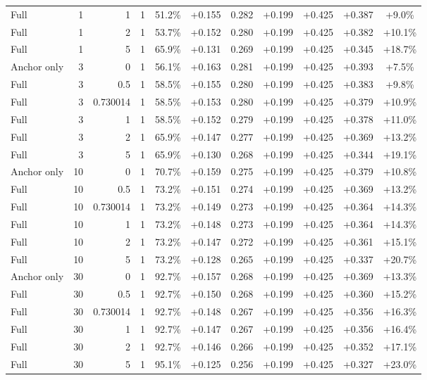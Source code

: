 \begin{table}[htbp]
\begin{tabular}{lrrrccccccc}
Full & 1 & 1 & 1 & 51.2\% & +0.155 & 0.282 & +0.199 & +0.425 & +0.387 & +9.0\% \\
Full & 1 & 2 & 1 & 53.7\% & +0.152 & 0.280 & +0.199 & +0.425 & +0.382 & +10.1\% \\
Full & 1 & 5 & 1 & 65.9\% & +0.131 & 0.269 & +0.199 & +0.425 & +0.345 & +18.7\% \\
Anchor only & 3 & 0 & 1 & 56.1\% & +0.163 & 0.281 & +0.199 & +0.425 & +0.393 & +7.5\% \\
Full & 3 & 0.5 & 1 & 58.5\% & +0.155 & 0.280 & +0.199 & +0.425 & +0.383 & +9.8\% \\
Full & 3 & 0.730014 & 1 & 58.5\% & +0.153 & 0.280 & +0.199 & +0.425 & +0.379 & +10.9\% \\
Full & 3 & 1 & 1 & 58.5\% & +0.152 & 0.279 & +0.199 & +0.425 & +0.378 & +11.0\% \\
Full & 3 & 2 & 1 & 65.9\% & +0.147 & 0.277 & +0.199 & +0.425 & +0.369 & +13.2\% \\
Full & 3 & 5 & 1 & 65.9\% & +0.130 & 0.268 & +0.199 & +0.425 & +0.344 & +19.1\% \\
Anchor only & 10 & 0 & 1 & 70.7\% & +0.159 & 0.275 & +0.199 & +0.425 & +0.379 & +10.8\% \\
Full & 10 & 0.5 & 1 & 73.2\% & +0.151 & 0.274 & +0.199 & +0.425 & +0.369 & +13.2\% \\
Full & 10 & 0.730014 & 1 & 73.2\% & +0.149 & 0.273 & +0.199 & +0.425 & +0.364 & +14.3\% \\
Full & 10 & 1 & 1 & 73.2\% & +0.148 & 0.273 & +0.199 & +0.425 & +0.364 & +14.3\% \\
Full & 10 & 2 & 1 & 73.2\% & +0.147 & 0.272 & +0.199 & +0.425 & +0.361 & +15.1\% \\
Full & 10 & 5 & 1 & 73.2\% & +0.128 & 0.265 & +0.199 & +0.425 & +0.337 & +20.7\% \\
Anchor only & 30 & 0 & 1 & 92.7\% & +0.157 & 0.268 & +0.199 & +0.425 & +0.369 & +13.3\% \\
Full & 30 & 0.5 & 1 & 92.7\% & +0.150 & 0.268 & +0.199 & +0.425 & +0.360 & +15.2\% \\
Full & 30 & 0.730014 & 1 & 92.7\% & +0.148 & 0.267 & +0.199 & +0.425 & +0.356 & +16.3\% \\
Full & 30 & 1 & 1 & 92.7\% & +0.147 & 0.267 & +0.199 & +0.425 & +0.356 & +16.4\% \\
Full & 30 & 2 & 1 & 92.7\% & +0.146 & 0.266 & +0.199 & +0.425 & +0.352 & +17.1\% \\
Full & 30 & 5 & 1 & 95.1\% & +0.125 & 0.256 & +0.199 & +0.425 & +0.327 & +23.0\% \\

\end{tabular}
\end{table}

